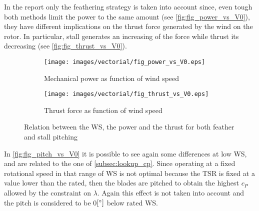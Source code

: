In the report only the feathering strategy is taken into account since, even tough both methods limit the power to the same amount (see \autoref{fig:fig_power_vs_V0}), they have different implications on the thrust force generated by the wind on the rotor. In particular, stall generates an increasing of the force while thrust its decreasing (see \autoref{fig:fig_thrust_vs_V0}).
\begin{figure}[htb]
    \centering
    \begin{subfigure}{0.49\textwidth}
    \centering
    \texttt{[image: images/vectorial/fig\_power\_vs\_V0.eps]}
    \caption{Mechanical power as function of wind speed}
    \label{fig:fig_power_vs_V0}
    \end{subfigure}
    \begin{subfigure}{0.49\textwidth}
    \texttt{[image: images/vectorial/fig\_thrust\_vs\_V0.eps]}
    \caption{Thrust force as function of wind speed}
    \label{fig:fig_thrust_vs_V0}
    \end{subfigure}
    \caption{Relation between the \acrshort{WS}, the power and the thrust for both feather and stall pitching}
    \label{fig:P_T_vs_V0}
\end{figure}

In \autoref{fig:fig_pitch_vs_V0} it is possible to see again some differences at low \acrshort{WS}, and are related to the one of \ref{subsec:lookup_cp}. Since operating at a fixed rotational speed in that range of \acrshort{WS} is not optimal because the \acrshort{TSR} is fixed at a value lower than the rated, then the blades are pitched to obtain the highest $c_P$ allowed by the constraint on $\lambda$. Again this effect is not taken into account and the pitch is considered to be 0$\left[\si{\degree}\right]$ below rated \acrlong{WS}.
\newpage